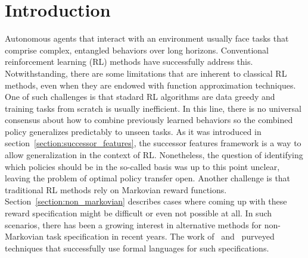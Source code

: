 \section{Introduction}

Autonomous agents that interact with an environment usually face tasks that comprise complex, entangled behaviors over long horizons. Conventional reinforcement learning (RL) methods have successfully address this. Notwithstanding, there are some limitations that are inherent to classical RL methods, even when they are endowed with function approximation techniques. One of such challenges is that stadard RL algorithms are data greedy and training tasks from scratch is usually inefficient. In this line, there is no universal consensus about how to combine previously learned behaviors so the combined policy generalizes predictably to unseen tasks. As it was introduced in section~\ref{section:successor_features}, the successor features framework is a way to allow generalization in the context of RL. Nonetheless, the question of identifying which policies should be in the so-called basis was up to this point unclear, leaving the problem of optimal policy transfer open. Another challenge is that traditional RL methods rely on Markovian reward functions. Section~\ref{section:non_markovian} describes cases where coming up with these reward specification might be difficult or even not possible at all. In such scenarios, there has been a growing interest in alternative methods for non-Markovian task specification in recent years. The work of~\citet{Camacho2019} and~\citet{Icarte2022} purveyed techniques that successfully use formal languages for such specifications. 

